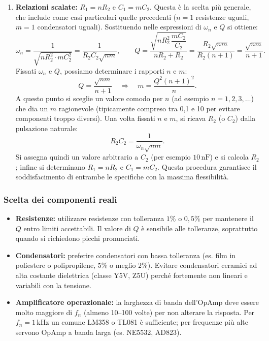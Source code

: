 \begin{enumerate}
\item \textbf{Relazioni scalate:} \(R_1 = nR_2\) e \(C_1 = mC_2\).  
Questa è la scelta più generale, che include come casi particolari quelle precedenti (\(n=1\) resistenze uguali, \(m=1\) condensatori uguali). Sostituendo nelle espressioni di \(\omega_n\) e \(Q\) si ottiene:
\begin{equation}
\omega_n = \frac{1}{\sqrt{nR_2^2 \cdot mC_2^2}} = \frac{1}{R_2C_2\sqrt{nm}}, \qquad 
Q = \frac{\sqrt{nR_2^2\,\dfrac{mC_2}{C_2}}}{nR_2+R_2} = \frac{R_2\sqrt{nm}}{R_2(n+1)} = \frac{\sqrt{nm}}{n+1}. \label{eq:wnQ_general LP}
\end{equation}
Fissati \(\omega_n\) e \(Q\), possiamo determinare i rapporti \(n\) e \(m\):
\begin{equation}
Q = \frac{\sqrt{nm}}{n+1} \quad\Rightarrow\quad m = \frac{Q^2 (n+1)^2}{n}. \label{eq:m_n LP}
\end{equation}
A questo punto si sceglie un valore comodo per \(n\) (ad esempio \(n=1,2,3,\dots\)) che dia un \(m\) ragionevole (tipicamente compreso tra 0,1 e 10 per evitare componenti troppo diversi). Una volta fissati \(n\) e \(m\), si ricava \(R_2\) (o \(C_2\)) dalla pulsazione naturale:
\begin{equation}
R_2C_2 = \frac{1}{\omega_n\sqrt{nm}}. \label{eq:R2C2 LP}
\end{equation}
Si assegna quindi un valore arbitrario a \(C_2\) (per esempio \(10\,\text{nF}\)) e si calcola \(R_2\); infine si determinano \(R_1=nR_2\) e \(C_1=mC_2\). Questa procedura garantisce il soddisfacimento di entrambe le specifiche con la massima flessibilità.
\end{enumerate}
\subsubsection{Scelta dei componenti reali}
\begin{itemize}
\item \textbf{Resistenze:} utilizzare resistenze con tolleranza \(1\%\) o \(0,5\%\) per mantenere il \(Q\) entro limiti accettabili. Il valore di \(Q\) è sensibile alle tolleranze, soprattutto quando si richiedono picchi pronunciati.
\item \textbf{Condensatori:} preferire condensatori con bassa tolleranza (es. film in poliestere o polipropilene, \(5\%\) o meglio \(2\%\)). Evitare condensatori ceramici ad alta costante dielettrica (classe Y5V, Z5U) perché fortemente non lineari e variabili con la tensione.
\item \textbf{Amplificatore operazionale:} la larghezza di banda dell'OpAmp deve essere molto maggiore di \(f_n\) (almeno 10–100 volte) per non alterare la risposta. Per \(f_n = 1\,\text{kHz}\) un comune LM358 o TL081 è sufficiente; per frequenze più alte servono OpAmp a banda larga (es. NE5532, AD823).
\end{itemize}



